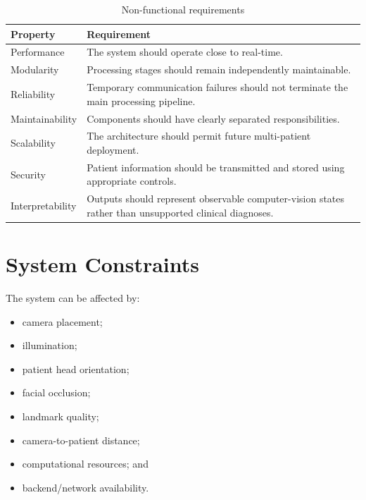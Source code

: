 \documentclass{tietreport}
\begin{document}
\begin{table}[H]
\centering
\caption{Non-functional requirements}
\label{tab:nonfunctional}

\begin{tabularx}{0.95\textwidth}{@{}P{3.2cm}Y@{}}

\toprule
\textbf{Property} & \textbf{Requirement}\\
\midrule

Performance &
The system should operate close to real-time.\\

Modularity &
Processing stages should remain independently maintainable.\\

Reliability &
Temporary communication failures should not terminate the main
processing pipeline.\\

Maintainability &
Components should have clearly separated responsibilities.\\

Scalability &
The architecture should permit future multi-patient deployment.\\

Security &
Patient information should be transmitted and stored using appropriate
controls.\\

Interpretability &
Outputs should represent observable computer-vision states rather
than unsupported clinical diagnoses.\\

\bottomrule

\end{tabularx}
\end{table}


\section{System Constraints}

The system can be affected by:

\begin{itemize}
    \item camera placement;
    \item illumination;
    \item patient head orientation;
    \item facial occlusion;
    \item landmark quality;
    \item camera-to-patient distance;
    \item computational resources; and
    \item backend/network availability.
\end{itemize}
\end{document}
